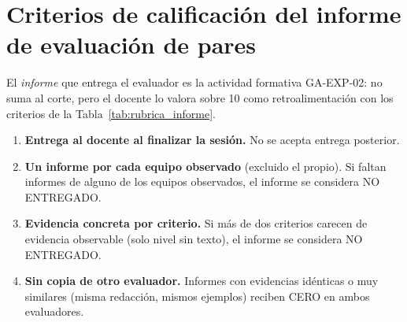\documentclass[11pt]{article}
\begin{document}
\section{\textcolor{utegreendk}{Criterios de calificación del informe de evaluación de pares}}

El \emph{informe} que entrega el evaluador es la actividad formativa GA-EXP-02: no suma al corte, pero el docente lo valora sobre 10 como retroalimentación con los criterios de la Tabla~\ref{tab:rubrica_informe}.

\begin{cajapiso}[title={Criterios de piso del informe: incumplimiento implica CERO en el informe}]
	\begin{enumerate}[label=\textbf{P\arabic*.},leftmargin=24pt,itemsep=3pt]
		\item \textbf{Entrega al docente al finalizar la sesión.} No se acepta entrega posterior.
		\item \textbf{Un informe por cada equipo observado} (excluido el propio). Si faltan informes de alguno de los equipos observados, el informe se considera NO ENTREGADO.
		\item \textbf{Evidencia concreta por criterio.} Si más de dos criterios carecen de evidencia observable (solo nivel sin texto), el informe se considera NO ENTREGADO.
		\item \textbf{Sin copia de otro evaluador.} Informes con evidencias idénticas o muy similares (misma redacción, mismos ejemplos) reciben CERO en ambos evaluadores.
	\end{enumerate}
\end{cajapiso}
\end{document}
